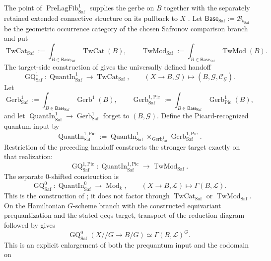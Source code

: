 \begin{construction}
The point of $\operatorname{PreLagFib}^{1}_{\mathrm{Saf}}$ supplies the gerbe on
$B$ together with the separately retained extended connective structure on its
pullback to $X$ \cite[Definition~2.13]{Safronov2020}.  Let
$\mathsf{Base}_{\mathrm{Saf}}:=\mathcal B_{b_{\mathrm{Saf}}}$ be the geometric
occurrence category of the chosen Safronov comparison branch and put
\[
\operatorname{TwCat}_{\mathrm{Saf}}
:=
\int_{B\in\mathsf{Base}_{\mathrm{Saf}}}\operatorname{TwCat}(B),
\qquad
\operatorname{TwMod}_{\mathrm{Saf}}
:=
\int_{B\in\mathsf{Base}_{\mathrm{Saf}}}\operatorname{TwMod}(B).
\]
The target-side construction of
\cite[Definition~3.1]{Safronov2020} gives the universally defined handoff
\[
\boxed{
\operatorname{GQ}_{\mathrm{Saf}}^1:
\operatorname{QuantIn}_{\mathrm{Saf}}^1
\longrightarrow\operatorname{TwCat}_{\mathrm{Saf}},
\qquad
(X\to B,\mathcal G)\longmapsto
(B,\mathcal G,\mathcal C_{\mathcal G}).
}
\]
Let
\[
\operatorname{Gerb}^{1}_{\mathrm{Saf}}
:=
\int_{B\in\mathsf{Base}_{\mathrm{Saf}}}\operatorname{Gerb}^{1}(B),
\qquad
\operatorname{Gerb}^{1,\mathrm{Pic}}_{\mathrm{Saf}}
:=
\int_{B\in\mathsf{Base}_{\mathrm{Saf}}}
\operatorname{Gerb}^{1}_{\mathrm{Pic}}(B),
\]
and let
$\operatorname{QuantIn}_{\mathrm{Saf}}^1\to
\operatorname{Gerb}^{1}_{\mathrm{Saf}}$ forget to $(B,\mathcal G)$.  Define the
Picard-recognized quantum input by
\[
\boxed{
\operatorname{QuantIn}_{\mathrm{Saf}}^{1,\mathrm{Pic}}
:=
\operatorname{QuantIn}_{\mathrm{Saf}}^1
\times_{\operatorname{Gerb}^{1}_{\mathrm{Saf}}}
\operatorname{Gerb}^{1,\mathrm{Pic}}_{\mathrm{Saf}}.
}
\]
Restriction of the preceding handoff constructs the stronger target exactly on
that realization:
\[
\boxed{
\operatorname{GQ}_{\mathrm{Saf}}^{1,\mathrm{Pic}}:
\operatorname{QuantIn}_{\mathrm{Saf}}^{1,\mathrm{Pic}}
\longrightarrow\operatorname{TwMod}_{\mathrm{Saf}}.
}
\]
The separate $0$-shifted construction is
\[
\operatorname{GQ}_{\mathrm{Saf}}^0:
\operatorname{QuantIn}_{\mathrm{Saf}}^0
\longrightarrow\operatorname{Mod}_k,
\qquad
(X\to B,\mathcal L)\longmapsto\Gamma(B,\mathcal L).
\]
This is the construction of
\cite[Definition~3.7]{Safronov2020}; it does not factor through
$\operatorname{TwCat}_{\mathrm{Saf}}$ or
$\operatorname{TwMod}_{\mathrm{Saf}}$.
On the Hamiltonian $G$-scheme branch with the constructed equivariant
prequantization and the stated qcqs target, transport of the reduction diagram
followed by \cite[Proposition~4.13]{Safronov2020} gives
\[
\boxed{
\operatorname{GQ}_{\mathrm{Saf}}^0
(X/\!/G\longrightarrow B/G)
\simeq
\Gamma(B,\mathcal L)^G.
}
\]
This is an explicit enlargement of both the prequantum input and the codomain on

\end{construction}
